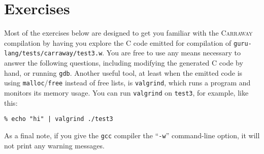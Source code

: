 \documentclass{book}[12pt]
\newcommand{\carraway}[0]{\textsc{Carraway}\xspace}
\begin{document}
\section{Exercises}

Most of the exercises below are designed to get you familiar with the
\carraway compilation by having you explore the C code emitted for
compilation of \texttt{guru-lang/tests/carraway/test3.w}.  You are
free to use any means necessary to answer the following questions,
including modifying the generated C code by hand, or running
\texttt{gdb}.  Another useful tool, at least when the emitted code is
using \texttt{malloc}/\texttt{free} instead of free lists, is
\texttt{valgrind}, which runs a program and monitors its memory usage.
You can run \texttt{valgrind} on \texttt{test3}, for example, like
this:

\begin{verbatim}
% echo "hi" | valgrind ./test3
\end{verbatim}

\noindent As a final note, if you give the \texttt{gcc} compiler the
``\texttt{-w}'' command-line option, it will not print any warning
messages.
\end{document}
